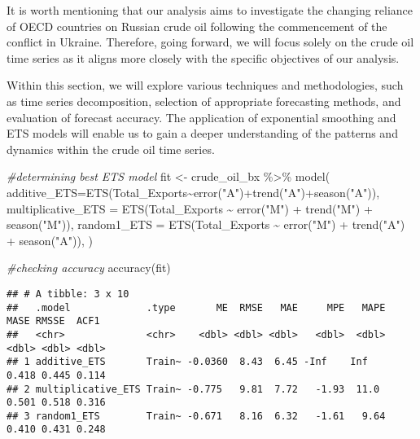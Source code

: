 \documentclass[
]{article}
\newenvironment{Shaded}{\begin{snugshade}}{\end{snugshade}}
\newcommand{\AttributeTok}[1]{\textcolor[rgb]{0.77,0.63,0.00}{#1}}
\newcommand{\CommentTok}[1]{\textcolor[rgb]{0.56,0.35,0.01}{\textit{#1}}}
\newcommand{\FunctionTok}[1]{\textcolor[rgb]{0.00,0.00,0.00}{#1}}
\newcommand{\NormalTok}[1]{#1}
\newcommand{\OtherTok}[1]{\textcolor[rgb]{0.56,0.35,0.01}{#1}}
\newcommand{\SpecialCharTok}[1]{\textcolor[rgb]{0.00,0.00,0.00}{#1}}
\newcommand{\StringTok}[1]{\textcolor[rgb]{0.31,0.60,0.02}{#1}}
\begin{document}
It is worth mentioning that our analysis aims to investigate the
changing reliance of OECD countries on Russian crude oil following the
commencement of the conflict in Ukraine. Therefore, going forward, we
will focus solely on the crude oil time series as it aligns more closely
with the specific objectives of our analysis.

Within this section, we will explore various techniques and
methodologies, such as time series decomposition, selection of
appropriate forecasting methods, and evaluation of forecast accuracy.
The application of exponential smoothing and ETS models will enable us
to gain a deeper understanding of the patterns and dynamics within the
crude oil time series.

\begin{Shaded}
\begin{Highlighting}[]
\CommentTok{\#determining best ETS model}
\NormalTok{fit }\OtherTok{\textless{}{-}}\NormalTok{ crude\_oil\_bx }\SpecialCharTok{\%\textgreater{}\%} 
  \FunctionTok{model}\NormalTok{(}
    \AttributeTok{additive\_ETS=}\FunctionTok{ETS}\NormalTok{(Total\_Exports}\SpecialCharTok{\textasciitilde{}}\FunctionTok{error}\NormalTok{(}\StringTok{"A"}\NormalTok{)}\SpecialCharTok{+}\FunctionTok{trend}\NormalTok{(}\StringTok{"A"}\NormalTok{)}\SpecialCharTok{+}\FunctionTok{season}\NormalTok{(}\StringTok{"A"}\NormalTok{)),}
    \AttributeTok{multiplicative\_ETS =} \FunctionTok{ETS}\NormalTok{(Total\_Exports }\SpecialCharTok{\textasciitilde{}} \FunctionTok{error}\NormalTok{(}\StringTok{"M"}\NormalTok{) }\SpecialCharTok{+} \FunctionTok{trend}\NormalTok{(}\StringTok{"M"}\NormalTok{) }\SpecialCharTok{+} \FunctionTok{season}\NormalTok{(}\StringTok{"M"}\NormalTok{)),}
    \AttributeTok{random1\_ETS =} \FunctionTok{ETS}\NormalTok{(Total\_Exports }\SpecialCharTok{\textasciitilde{}} \FunctionTok{error}\NormalTok{(}\StringTok{"M"}\NormalTok{) }\SpecialCharTok{+} \FunctionTok{trend}\NormalTok{(}\StringTok{"A"}\NormalTok{) }\SpecialCharTok{+} \FunctionTok{season}\NormalTok{(}\StringTok{"A"}\NormalTok{)),}
\NormalTok{  )}

\CommentTok{\#checking accuracy}
\FunctionTok{accuracy}\NormalTok{(fit) }
\end{Highlighting}
\end{Shaded}

\begin{verbatim}
## # A tibble: 3 x 10
##   .model             .type       ME  RMSE   MAE     MPE   MAPE  MASE RMSSE  ACF1
##   <chr>              <chr>    <dbl> <dbl> <dbl>   <dbl>  <dbl> <dbl> <dbl> <dbl>
## 1 additive_ETS       Train~ -0.0360  8.43  6.45 -Inf    Inf    0.418 0.445 0.114
## 2 multiplicative_ETS Train~ -0.775   9.81  7.72   -1.93  11.0  0.501 0.518 0.316
## 3 random1_ETS        Train~ -0.671   8.16  6.32   -1.61   9.64 0.410 0.431 0.248
\end{verbatim}
\end{document}
